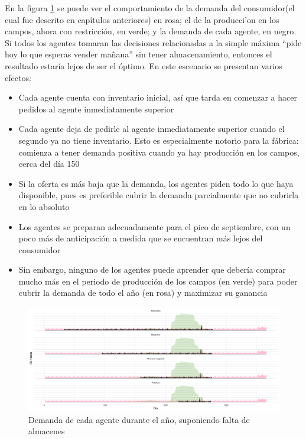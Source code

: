 En la figura \ref{analytic_3} se puede ver el comportamiento de la demanda del consumidor(el cual fue descrito en cap\'itulos anteriores) en rosa; el de la producci'on en los campos, ahora con restricci\'on, en verde; y la demanda de cada agente, en negro. \\

Si todos los agentes tomaran las decisiones relacionadas a la simple m\'axima ``pide hoy lo que esperas vender ma\~nana'' sin tener almacenamiento, entonces el resultado estar\'ia lejos de ser el \'optimo.
En este escenario se presentan varios efectos: 
\begin{itemize}
    \item Cada agente cuenta con inventario inicial, as\'i que tarda en comenzar a hacer pedidos al agente inmediatamente superior
    \item Cada agente deja de pedirle al agente inmediatamente superior cuando el segundo ya no tiene inventario. Esto es especialmente notorio para la f\'abrica: comienza a tener demanda positiva cuando ya hay producci\'on en los campos, cerca del d\'ia 150
    \item Si la oferta es m\'as baja que la demanda, los agentes piden todo lo que haya disponible, pues es preferible cubrir la demanda parcialmente que no cubrirla en lo absoluto
    \item Los agentes se preparan adecuadamente para el pico de septiembre, con un poco m\'as de anticipaci\'on a medida que se encuentran m\'as lejos del consumidor
    \item Sin embargo, ninguno de los agentes puede aprender que deber\'ia comprar mucho m\'as en el periodo de producci\'on de los campos (en verde) para poder cubrir la demanda de todo el a\~no (en rosa) y maximizar su ganancia
\end{itemize}

\begin{figure}[ht!]
\caption{Demanda de cada agente durante el a\~no, suponiendo falta de almacenes}
\label{analytic_3}
\includegraphics[width=16cm]{tesis_tex/figs/analytic_with_fields_restriction.png}
\centering
\end{figure}

